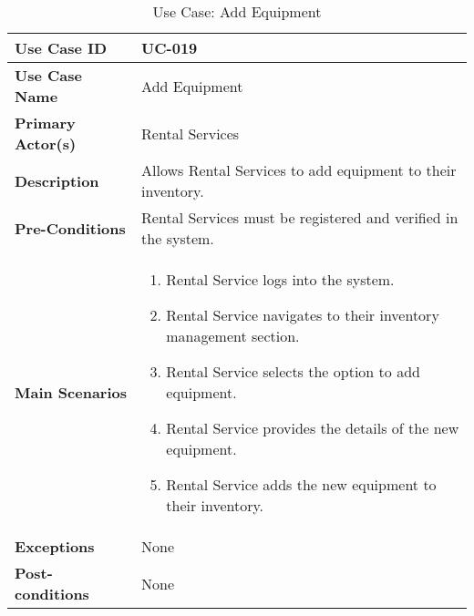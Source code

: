 \begin{table}[ht]
    \centering
    \begin{tabular}{|l|p{}|}
        \hline
        \textbf{Use Case ID} & UC-019 \\
        \hline
        \textbf{Use Case Name} & Add Equipment \\
        \hline
        \textbf{Primary Actor(s)} & Rental Services \\
        \hline
        \textbf{Description} & Allows Rental Services to add equipment to their inventory. \\
        \hline
        \textbf{Pre-Conditions} & Rental Services must be registered and verified in the system. \\
        \hline
        \textbf{Main Scenarios} & 
        \begin{enumerate}[label=\arabic*.,itemsep=0pt]
            \item Rental Service logs into the system.
            \item Rental Service navigates to their inventory management section.
            \item Rental Service selects the option to add equipment.
            \item Rental Service provides the details of the new equipment.
            \item Rental Service adds the new equipment to their inventory.
        \end{enumerate} \\
        \hline
        \textbf{Exceptions} & None \\
        \hline
        \textbf{Post-conditions} & None \\
        \hline
    \end{tabular}
    \label{tab:use-case-add-equipment}
    \caption{Use Case: Add Equipment}
\end{table}


